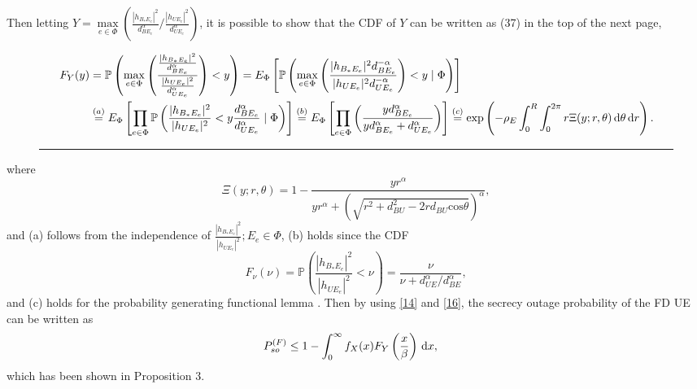 \documentclass[10pt]{IEEEtran}
\newcommand{\rmd}{\,{\rm d}}
\begin{document}
Then letting $Y = \underset{e\in \Phi}{\max}\left(\frac{|h_{B_*E_e}|^2}{d^\alpha_{BE_e}}/\frac{|h_{UE_e}|^2}{d^\alpha_{UE_e}}\right)$, it is possible to show that the CDF of $Y$ can be written as (37) in the top of the next page,
\begin{figure*}
\begin{equation} \label{16}
\begin{split}
F_{Y}(y) &= \mathbb{P}\left(\underset{e\in \Phi}{\max}\left(\frac{\frac{|h_{B_*E_e}|^2}{d^\alpha_{BE_e}}}{\frac{|h_{UE_e}|^2}{d^\alpha_{UE_e}}}\right)<y\right)= E_\Phi\left[\mathbb{P}\left(\underset{e\in \Phi}{\max}\left(\frac{|h_{B_*E_e}|^2d^{-\alpha}_{BE_e}}{|h_{UE_e}|^2d^{-\alpha}_{UE_e}}\right)<y\mid \Phi\right)\right]\\
&\overset{(a)}{=} E_\Phi\left[\prod_{e\in \Phi}\mathbb{P}\left(\frac{|h_{B_*E_e}|^2}{|h_{UE_e}|^2}<y\frac{d^{\alpha}_{BE_e}}{d^{\alpha}_{UE_e}}\mid \Phi\right)\right] \overset{(b)}{=} E_\Phi\left[\prod_{e\in \Phi}\left(\frac{yd_{BE_e}^\alpha}{yd_{BE_e}^\alpha+d_{UE_e}^\alpha}\right)\right]\overset{(c)}{=} \textrm{exp}\left(-\rho_E\int^{R}_0\int^{2\pi}_0r\Xi(y;r,\theta)\rmd\theta \rmd r\right).
\end{split}
\end{equation}
\hrule
\end{figure*}
where
\begin{equation}
  \Xi(y;r,\theta) = 1-\frac{yr^\alpha}{yr^\alpha+(\sqrt{r^2+d^2_{BU}-2rd_{BU}\textrm{cos}\theta})^\alpha},
\end{equation}
and (a) follows from the independence of ${ \frac{|h_{B_*E_e}|^2}{|h_{UE_e}|^2}; E_e\in\Phi}$, (b) holds since the CDF
\begin{equation}
F_\nu(\nu) = \mathbb{P}\left(\frac{|h_{B_*E_e}|^2}{|h_{UE_e}|^2}<\nu\right) = \frac{\nu}{\nu+d^\alpha_{UE}/d^\alpha_{BE}},
\end{equation}
and (c) holds for the probability generating functional lemma \cite{M.H12}. Then by using \eqref{14} and \eqref{16}, the secrecy outage probability of the FD UE can be written as
\begin{equation}\label{mm}
\begin{split}
P^{(F)}_{so} &\leq 1- \int_0^\infty f_{X}(x)F_{Y}\left(\frac{x}{\beta}\right)\rmd x,
\end{split}
\end{equation}
which has been shown in Proposition 3.
\end{document}
